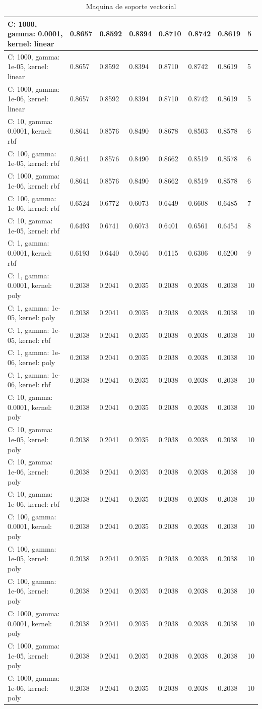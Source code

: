 \begin{table}[H]
{\begin{tabular}{|l|l|l|l|l|l|l|l|}
\hline
C: 1000, gamma: 0.0001, kernel: linear&0.8657&0.8592&0.8394&0.8710&0.8742&0.8619&5\\
\hline
C: 1000, gamma: 1e-05, kernel: linear&0.8657&0.8592&0.8394&0.8710&0.8742&0.8619&5\\
\hline
C: 1000, gamma: 1e-06, kernel: linear&0.8657&0.8592&0.8394&0.8710&0.8742&0.8619&5\\
\hline
C: 10, gamma: 0.0001, kernel: rbf&0.8641&0.8576&0.8490&0.8678&0.8503&0.8578&6\\
\hline
C: 100, gamma: 1e-05, kernel: rbf&0.8641&0.8576&0.8490&0.8662&0.8519&0.8578&6\\
\hline
C: 1000, gamma: 1e-06, kernel: rbf&0.8641&0.8576&0.8490&0.8662&0.8519&0.8578&6\\
\hline
C: 100, gamma: 1e-06, kernel: rbf&0.6524&0.6772&0.6073&0.6449&0.6608&0.6485&7\\
\hline
C: 10, gamma: 1e-05, kernel: rbf&0.6493&0.6741&0.6073&0.6401&0.6561&0.6454&8\\
\hline
C: 1, gamma: 0.0001, kernel: rbf&0.6193&0.6440&0.5946&0.6115&0.6306&0.6200&9\\
\hline
C: 1, gamma: 0.0001, kernel: poly&0.2038&0.2041&0.2035&0.2038&0.2038&0.2038&10\\
\hline
C: 1, gamma: 1e-05, kernel: poly&0.2038&0.2041&0.2035&0.2038&0.2038&0.2038&10\\
\hline
C: 1, gamma: 1e-05, kernel: rbf&0.2038&0.2041&0.2035&0.2038&0.2038&0.2038&10\\
\hline
C: 1, gamma: 1e-06, kernel: poly&0.2038&0.2041&0.2035&0.2038&0.2038&0.2038&10\\
\hline
C: 1, gamma: 1e-06, kernel: rbf&0.2038&0.2041&0.2035&0.2038&0.2038&0.2038&10\\
\hline
C: 10, gamma: 0.0001, kernel: poly&0.2038&0.2041&0.2035&0.2038&0.2038&0.2038&10\\
\hline
C: 10, gamma: 1e-05, kernel: poly&0.2038&0.2041&0.2035&0.2038&0.2038&0.2038&10\\
\hline
C: 10, gamma: 1e-06, kernel: poly&0.2038&0.2041&0.2035&0.2038&0.2038&0.2038&10\\
\hline
C: 10, gamma: 1e-06, kernel: rbf&0.2038&0.2041&0.2035&0.2038&0.2038&0.2038&10\\
\hline
C: 100, gamma: 0.0001, kernel: poly&0.2038&0.2041&0.2035&0.2038&0.2038&0.2038&10\\
\hline
C: 100, gamma: 1e-05, kernel: poly&0.2038&0.2041&0.2035&0.2038&0.2038&0.2038&10\\
\hline
C: 100, gamma: 1e-06, kernel: poly&0.2038&0.2041&0.2035&0.2038&0.2038&0.2038&10\\
\hline
C: 1000, gamma: 0.0001, kernel: poly&0.2038&0.2041&0.2035&0.2038&0.2038&0.2038&10\\
\hline
C: 1000, gamma: 1e-05, kernel: poly&0.2038&0.2041&0.2035&0.2038&0.2038&0.2038&10\\
\hline
C: 1000, gamma: 1e-06, kernel: poly&0.2038&0.2041&0.2035&0.2038&0.2038&0.2038&10\\
\hline

	\end{tabular}
}
\caption{Maquina de soporte vectorial}
\label{tab:cp5:msv}
\end{table}
